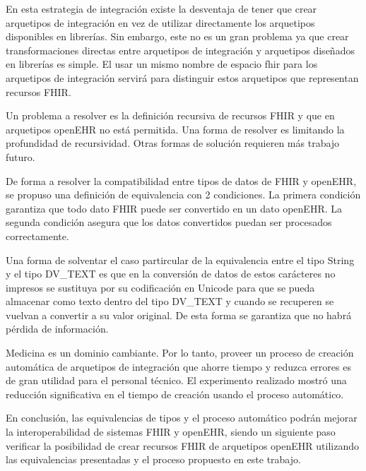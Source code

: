 En esta estrategia de integración existe la desventaja de tener que crear arquetipos de integración en vez de utilizar directamente los arquetipos disponibles en librerías. Sin embargo, este no es un gran problema ya que crear transformaciones directas entre arquetipos de integración y arquetipos diseñados en librerías es simple. El usar un mismo nombre de espacio fhir para los arquetipos de integración servirá para distinguir estos arquetipos que representan recursos FHIR.

Un problema a resolver es la definición recursiva de recursos FHIR y que en arquetipos openEHR no está permitida. Una forma de resolver es limitando la profundidad de recursividad. Otras formas de solución requieren más trabajo futuro.

De forma a resolver la compatibilidad entre tipos de datos de FHIR y openEHR, se propuso una definición de equivalencia con 2 condiciones. La primera condición garantiza que todo dato FHIR puede ser convertido en un dato openEHR. La segunda condición asegura que los datos convertidos puedan ser procesados correctamente.

Una forma de solventar el caso partircular de la equivalencia entre el tipo String y el tipo DV\_TEXT es que en la conversión de datos de estos carácteres no impresos se sustituya por su codificación en Unicode para que se pueda almacenar como texto dentro del tipo DV\_TEXT y cuando se recuperen se vuelvan a convertir a su valor original. De esta forma se garantiza que no habrá pérdida de información.

Medicina es un dominio cambiante. Por lo tanto, proveer un proceso de creación automática de arquetipos de integración que ahorre tiempo y reduzca errores es de gran utilidad para el personal técnico. El experimento realizado mostró una reducción significativa en el tiempo de creación usando el proceso automático.

En conclusión, las equivalencias de tipos y el proceso automático podrán mejorar la interoperabilidad de sistemas FHIR y openEHR, siendo un siguiente paso verificar la posibilidad de crear recursos FHIR de arquetipos openEHR utilizando las equivalencias presentadas y el proceso propuesto en este trabajo.
